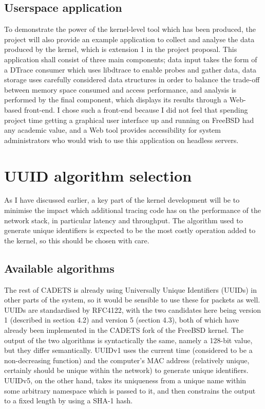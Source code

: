\documentclass[a4paper,12pt,twoside,openright]{report}
\begin{document}
	\subsection{Userspace application}
	
	To demonstrate the power of the kernel-level tool which has been produced, the project will also provide an example application to collect and analyse the data produced by the kernel, which is extension 1 in the project proposal. This application shall consist of three main components; data input takes the form of a DTrace consumer which uses libdtrace to enable probes and gather data, data storage uses carefully considered data structures in order to balance the trade-off between memory space consumed and access performance, and analysis is performed by the final component, which displays its results through a Web-based front-end. I chose such a front-end because I did not feel that spending project time getting a graphical user interface up and running on FreeBSD had any academic value, and a Web tool provides accessibility for system administrators who would wish to use this application on headless servers.
	
	\section{UUID algorithm selection}
	
	As I have discussed earlier, a key part of the kernel development will be to minimise the impact which additional tracing code has on the performance of the network stack, in particular latency and throughput. The algorithm used to generate unique identifiers is expected to be the most costly operation added to the kernel, so this should be chosen with care.
	
	\subsection{Available algorithms}
	
	The rest of CADETS is already using Universally Unique Identifiers (UUIDs) in other parts of the system, so it would be sensible to use these for packets as well. UUIDs are standardised by RFC4122\cite{RFC4122}, with the two candidates here being version 1 (described in section 4.2) and version 5 (section 4.3), both of which have already been implemented in the CADETS fork of the FreeBSD kernel. The output of the two algorithms is syntactically the same, namely a 128-bit value, but they differ semantically. UUIDv1 uses the current time (considered to be a non-decreasing function) and the computer's MAC address (relatively unique, certainly should be unique within the network) to generate unique identifiers. UUIDv5, on the other hand, takes its uniqueness from a unique name within some arbitrary namespace which is passed to it, and then constrains the output to a fixed length by using a SHA-1 hash.
	
\end{document}
